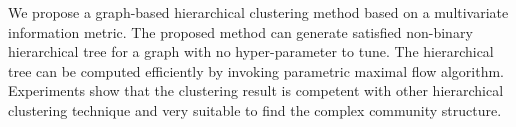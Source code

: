 We propose a graph-based hierarchical clustering method based on a multivariate information metric.
The proposed method can generate satisfied non-binary hierarchical tree for a graph with no hyper-parameter to tune. 
The hierarchical tree can be computed efficiently by 
invoking parametric maximal flow algorithm. 
Experiments show that the clustering result is competent with 
other hierarchical clustering technique and very suitable to find the complex community structure.